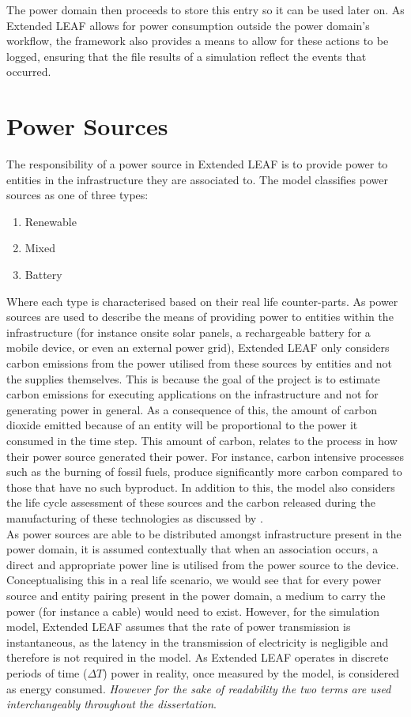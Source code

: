 \documentclass{l4proj}
\begin{document}
The power domain then proceeds to store this entry so it can be used later on.
As Extended LEAF allows for power consumption outside the power domain's workflow, the framework also provides a means to allow for these actions to be logged, ensuring that the file results of a simulation reflect the events that occurred.

\section{Power Sources}
The responsibility of a power source in Extended LEAF is to provide power to entities in the infrastructure they are associated to.
The model classifies power sources as one of three types:
\begin{enumerate}
    \item Renewable
    \item Mixed
    \item Battery
\end{enumerate}
Where each type is characterised based on their real life counter-parts.
As power sources are used to describe the means of providing power to entities within the infrastructure (for instance onsite solar panels, a rechargeable battery for a mobile device, or even an external power grid), Extended LEAF only considers carbon emissions from the power utilised from these sources by entities and not the supplies themselves.
This is because the goal of the project is to estimate carbon emissions for executing applications on the infrastructure and not for generating power in general.
As a consequence of this, the amount of carbon dioxide emitted because of an entity will be proportional to the power it consumed in the time step.
This amount of carbon, relates to the process in how their power source generated their power.
For instance, carbon intensive processes such as the burning of fossil fuels, produce significantly more carbon compared to those that have no such byproduct.
In addition to this, the model also considers the life cycle assessment of these sources and the carbon released during the manufacturing of these technologies as discussed by \cite{PEHNT200655}.\\

As power sources are able to be distributed amongst infrastructure present in the power domain, it is assumed contextually that when an association occurs, a direct and appropriate power line is utilised from the power source to the device.
Conceptualising this in a real life scenario, we would see that for every power source and entity pairing present in the power domain, a medium to carry the power (for instance a cable) would need to exist.
However, for the simulation model, Extended LEAF assumes that the rate of power transmission is instantaneous, as the latency in the transmission of electricity is negligible \citep{speed-of-electricity} and therefore is not required in the model.
As Extended LEAF operates in discrete periods of time ($\varDelta T$) power in reality, once measured by the model, is considered as energy consumed.
\textit{However for the sake of readability the two terms are used interchangeably throughout the dissertation}.\\
\end{document}
